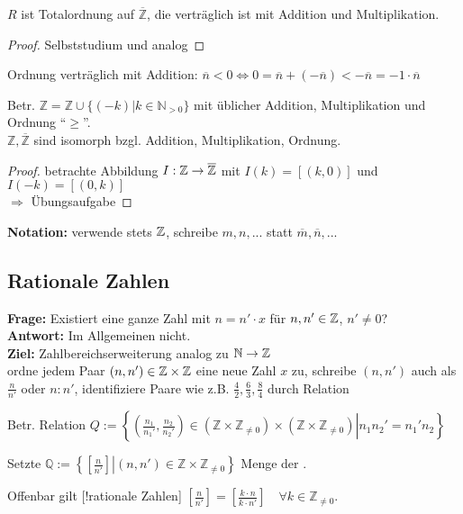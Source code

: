 \begin{proposition}
	$R$ ist Totalordnung auf $\overline{\mathbb{Z}}$, die verträglich ist mit Addition und Multiplikation.
\end{proposition}
\begin{proof}
	Selbststudium und analog
\end{proof}

Ordnung verträglich mit Addition: $\overline{n}<0\iff 0=\overline{n}+(-\overline{n})< -\overline{n}=-1\cdot \overline{n}$

\begin{proposition}
	Betr. $\mathbb{Z} = \mathbb{Z}\cup\{ (-k) | k\in\mathbb{N}_{>0} \}$ mit üblicher Addition, Multiplikation und Ordnung "`$\ge$"'. \\
	$\mathbb{Z},\overline{\mathbb{Z}}$ sind isomorph bzgl. Addition, Multiplikation, Ordnung.
\end{proposition}
\begin{proof}
	betrachte Abbildung $I:\mathbb{Z}\to\overline{\mathbb{Z}}$ mit $I(k)=[(k,0)]$ und $I(-k)=[(0,k)]$ \\
	$\Rightarrow$ Übungsaufgabe
\end{proof}

\textbf{Notation:} verwende stets $\mathbb{Z}$, schreibe $m,n,...$ statt $\overline{m},\overline{n},...$

\subsection{Rationale Zahlen}

\textbf{Frage:} Existiert eine ganze Zahl mit $n=n'\cdot x$ für $n,n'\in\mathbb{Z}$, $n'\neq 0$? \\
\textbf{Antwort:} Im Allgemeinen nicht. \\
\textbf{Ziel:} Zahlbereichserweiterung analog zu $\mathbb{N}\to\mathbb{Z}$ \\
ordne jedem Paar $(n,n')\in\mathbb{Z}\times\mathbb{Z}$ eine neue Zahl $x$ zu, schreibe $(n,n')$ auch als 
$\frac{n}{n'}$ oder $n:n'$, identifiziere Paare wie z.B. $\frac{4}{2},\frac{6}{3},\frac{8}{4}$ durch Relation

\begin{definition}
	Betr. Relation $Q:=\left\lbrace \left. \left( \frac{n_1}{n_1'},\frac{n_2}{n_2'}\right) \in \left( \mathbb{Z}\times\mathbb{Z}_{\neq 0}\right)\times\left(\mathbb{Z}\times\mathbb{Z}_{\neq 0}\right) \right| n_1n_2' = n_1'n_2\right\rbrace$
	
	Setzte $\mathbb{Q} := \left\lbrace \left[ \left. \frac{n}{n'}\right] \right| (n,n')\in\mathbb{Z}\times\mathbb{Z}_{\neq 0}\right\rbrace$ Menge der .
	
	Offenbar gilt [!rationale Zahlen] $\left[ \frac{n}{n'}\right] = \left[ \frac{k\cdot n}{k\cdot n'}\right]\quad\forall k\in\mathbb{Z}_{\neq 0}$.
\end{definition}

